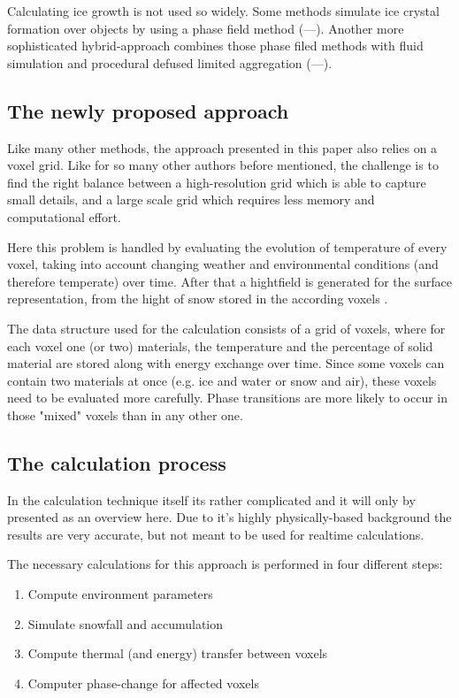 Calculating ice growth is not used so widely. Some methods simulate ice crystal formation over objects by using a phase field method (---). Another more sophisticated hybrid-approach combines those phase filed methods with fluid simulation and procedural defused limited aggregation (---).

\subsection{The newly proposed approach}
Like many other methods, the approach presented in this paper \cite{benes2001layered} also relies on a voxel grid. Like for so many other authors before mentioned, the challenge is to find the right balance between a high-resolution grid which is able to capture small details, and a large scale grid which requires less memory and computational effort.

Here this problem is handled by evaluating the evolution of temperature of every voxel, taking into account changing weather and environmental conditions (and therefore temperate) over time. After that a hightfield is generated for the surface representation, from the hight of snow stored in the according voxels \cite{benes2001layered}.

The data structure used for the calculation consists of a grid of voxels, where for each voxel one (or two) materials, the temperature and the percentage of solid material are stored along with energy exchange over time. Since some voxels can contain two materials at once (e.g. ice and water or snow and air), these voxels need to be evaluated more carefully. Phase transitions are more likely to occur in those "mixed" voxels than in any other one.

\subsection{The calculation process}
In the calculation technique itself its rather complicated and it will only by presented as an overview here. Due to it's highly physically-based background the results are very accurate, but not meant to be used for realtime calculations.

The necessary calculations for this approach is performed in four different steps:
\begin{enumerate}
	\item Compute environment parameters
	\item Simulate snowfall and accumulation
	\item Compute thermal (and energy) transfer between voxels
	\item Computer phase-change for affected voxels
\end{enumerate}

